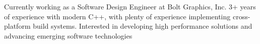 

\begin{cvparagraph}

Currently working as a Software Design Engineer at Bolt Graphics, Inc.
3+ years of experience with modern C++, with plenty of experience implementing cross-platform build systems.
Interested in developing high performance solutions and advancing emerging software technologies
\end{cvparagraph}
